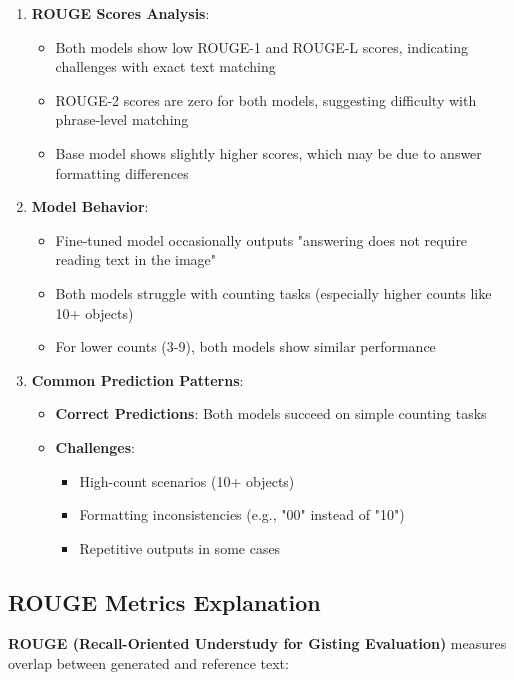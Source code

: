 \documentclass[conference]{IEEEtran}
\begin{document}
\begin{enumerate}
    \item \textbf{ROUGE Scores Analysis}:
    \begin{itemize}
        \item Both models show low ROUGE-1 and ROUGE-L scores, indicating challenges with exact text matching
        \item ROUGE-2 scores are zero for both models, suggesting difficulty with phrase-level matching
        \item Base model shows slightly higher scores, which may be due to answer formatting differences
    \end{itemize}
    
    \item \textbf{Model Behavior}:
    \begin{itemize}
        \item Fine-tuned model occasionally outputs "answering does not require reading text in the image"
        \item Both models struggle with counting tasks (especially higher counts like 10+ objects)
        \item For lower counts (3-9), both models show similar performance
    \end{itemize}
    
    \item \textbf{Common Prediction Patterns}:
    \begin{itemize}
        \item \textbf{Correct Predictions}: Both models succeed on simple counting tasks
        \item \textbf{Challenges}:
        \begin{itemize}
            \item High-count scenarios (10+ objects)
            \item Formatting inconsistencies (e.g., "00" instead of "10")
            \item Repetitive outputs in some cases
        \end{itemize}
    \end{itemize}
\end{enumerate}

\subsection{ROUGE Metrics Explanation}

\textbf{ROUGE (Recall-Oriented Understudy for Gisting Evaluation)} measures overlap between generated and reference text:
\end{document}
